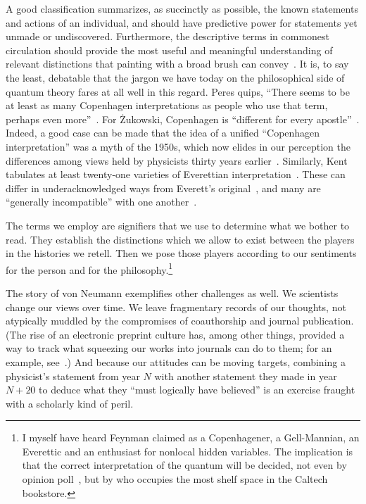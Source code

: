 \documentclass[aps,pra,superscriptaddress,12pt,tightenlines,nofootinbib]{revtex4-2}
\begin{document}
A good classification summarizes, as succinctly as possible, the known
statements and actions of an individual, and should have predictive
power for statements yet unmade or undiscovered.  Furthermore, the
descriptive terms in commonest circulation should provide the most
useful and meaningful understanding of relevant distinctions that
painting with a broad brush can convey~\cite{Brown2010}.  It is, to
say the least, debatable that the jargon we have today on the
philosophical side of quantum theory fares at all well in this regard.
Peres quips, ``There seems to be at least as many Copenhagen
interpretations as people who use that term, perhaps even
more''~\cite{Peres2002}.  For \.{Z}ukowski, Copenhagen is ``different
for every apostle''~\cite{Zukowski2015}.  Indeed, a
good case can be made that the idea of a unified ``Copenhagen
interpretation'' was a myth of the 1950s, which now elides in our
perception the differences among views held by physicists thirty years
earlier~\cite{Howard2004, Camilleri2009, Camilleri2015}.  Similarly,
Kent tabulates at least twenty-one varieties of Everettian
interpretation~\cite{Kent2010}.  These can differ in underacknowledged
ways from Everett's original~\cite{Kent2011}, and many are ``generally
incompatible'' with one another~\cite{Kent2014}.

The terms we employ are signifiers that we use to determine what we
bother to read.  They establish the distinctions which we allow to
exist between the players in the histories we retell.  Then we pose
those players according to our sentiments for the person and for the
philosophy.\footnote{I myself have heard Feynman claimed as a
  Copenhagener, a Gell-Mannian, an Everettic and an enthusiast for
  nonlocal hidden variables.  The implication is that the correct
  interpretation of the quantum will be decided, not even by opinion
  poll~\cite{Nielsen2004, Fuchs2014b}, but by who occupies the most
  shelf space in the Caltech bookstore.}

The story of von Neumann exemplifies other challenges as well.  We
scientists change our views over time.  We leave fragmentary records
of our thoughts, not atypically muddled by the compromises of
coauthorship and journal publication.  (The rise of an electronic
preprint culture has, among other things, provided a way to track what
squeezing our works into journals can do to them; for an example,
see~\cite{Ferrie2014}.)  And because our attitudes can be moving
targets, combining a physicist's statement from year $N$ with another
statement they made in year $N + 20$ to deduce what they ``must
logically have believed'' is an exercise fraught with a scholarly kind
of peril.
\end{document}
